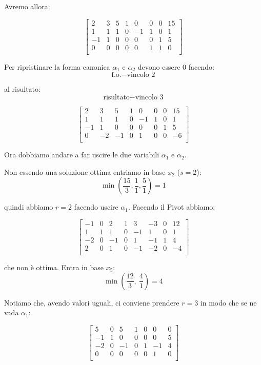 Avremo allora:

$$
\left[ {\begin{array}{cccccccc}
	2 & 3 & 5 & 1 & 0 & 0 & 0 & 15\\
	1 & 1 & 1 & 0 & -1 & 1 & 0 & 1\\
	-1 & 1 & 0 & 0 & 0 & 0 & 1 & 5\\
	0 & 0 & 0 & 0 & 0 & 1 & 1 & 0\\
\end{array} } \right]
$$

Per ripristinare la forma canonica $\alpha_1$ e $\alpha_2$ devono essere $0$ facendo:
$$\text{f.o.} - \text{vincolo 2}$$

al risultato:
$$\text{risultato} - \text{vincolo 3}$$

$$
\left[ {\begin{array}{cccccccc}
	2 & 3 & 5 & 1 & 0 & 0 & 0 & 15\\
	1 & 1 & 1 & 0 & -1 & 1 & 0 & 1\\
	-1 & 1 & 0 & 0 & 0 & 0 & 1 & 5\\
	0 & -2 & -1 & 0 & 1 & 0 & 0 & -6\\
\end{array} } \right]
$$

Ora dobbiamo andare a far uscire le due variabili $\alpha_1$ e $\alpha_2$.

Non essendo una soluzione ottima entriamo in base $x_2$ ($s = 2$):
$$\min (\frac{15}{3}, \frac{1}{1}, \frac{5}{1}) = 1$$

quindi abbiamo $r = 2$ facendo uscire $\alpha_1$. Facendo il Pivot abbiamo:

$$
\left[ {\begin{array}{cccccccc}
	-1 & 0 & 2 & 1 & 3 & -3 & 0 & 12\\
	1 & 1 & 1 & 0 & -1 & 1 & 0 & 1\\
	-2 & 0 & -1 & 0 & 1 & -1 & 1 & 4\\
	2 & 0 & 1 & 0 & -1 & -2 & 0 & -4\\
\end{array} } \right]
$$

che non è ottima. Entra in base $x_5$:
$$\min (\frac{12}{3},\ \frac{4}{1}) = 4$$

Notiamo che, avendo valori uguali, ci conviene prendere $r = 3$ in modo che se ne vada $\alpha_1$:

$$
\left[ {\begin{array}{ccccccc}
	5 & 0 & 5 & 1 & 0 & 0 & 0\\
	-1 & 1 & 0 & 0 & 0 & 0 & 5\\
	-2 & 0 & -1 & 0 & 1 & -1 & 4\\
	0 & 0 & 0 & 0 & 0 & 1 & 0\\
\end{array} } \right]
$$

